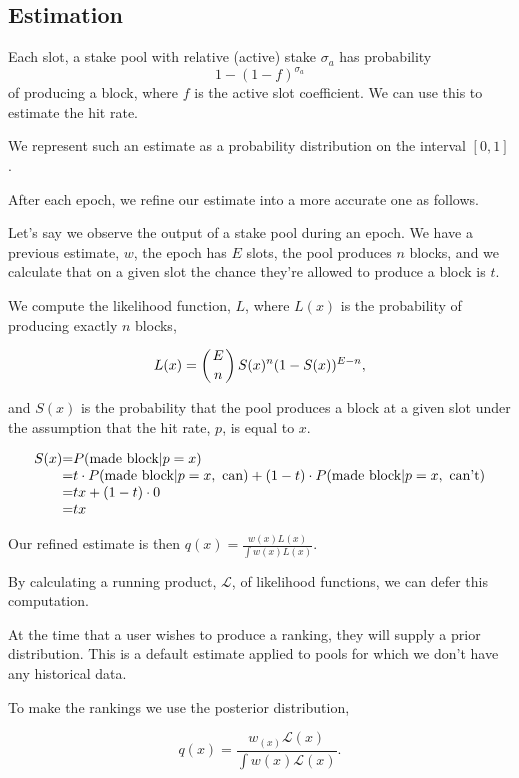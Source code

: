 \documentclass[11pt,a4paper,dvipsnames,twosided]{article}
\begin{document}
\subsection{Estimation}

Each slot, a stake pool with relative (active) stake $\sigma_a$ has probability
\[ 1 - (1-f)^{\sigma_a} \]
of producing a block, where $f$ is the active slot coefficient.
We can use this to estimate the hit rate.

We represent such an estimate as a probability distribution on the interval $[0,1]$.

After each epoch, we refine our estimate into a more accurate one as follows.

Let's say we
observe the output of a stake pool during an epoch. We have a previous estimate, $w$, the
epoch has $E$ slots, the pool produces $n$ blocks, and we calculate that on a given slot
the chance they're allowed to produce a block is $t$.

We compute the likelihood function, $L$, where $L(x)$ is the probability of producing exactly $n$ blocks,

\[ L(x) = \left( E \atop n \right) S(x)^{n} (1-S(x))^{E - n}, \]

and $S(x)$ is the probability that the pool produces a block at a given slot under the assumption that the
hit rate, $p$, is equal to $x$.

\[
\begin{array}{r@{=}l}
S(x) & P( \text{made block} | p = x) \\
     & t \cdot P( \text{made block} | p = x,~\text{can}) + (1-t) \cdot P( \text{made block} | p = x,~\text{can't}) \\
     & tx                              + (1-t) \cdot 0 \\
     & tx \\
\end{array}
\]

Our refined estimate is then $q(x) = \frac{w(x)L(x)}{\int w(x)L(x)}$.

By calculating a running product, $\mathcal{L}$, of likelihood functions, we can defer this computation.

At the time that a user wishes to produce a ranking, they will
supply a prior distribution. This is a default estimate applied to pools for which we don't have any historical data.

To make the rankings we use the posterior distribution,

\begin{equation}
\label{post}
q(x) = \frac{w_(x)\mathcal{L}(x)}{\int w(x)\mathcal{L}(x)}.
\end{equation}
\end{document}
